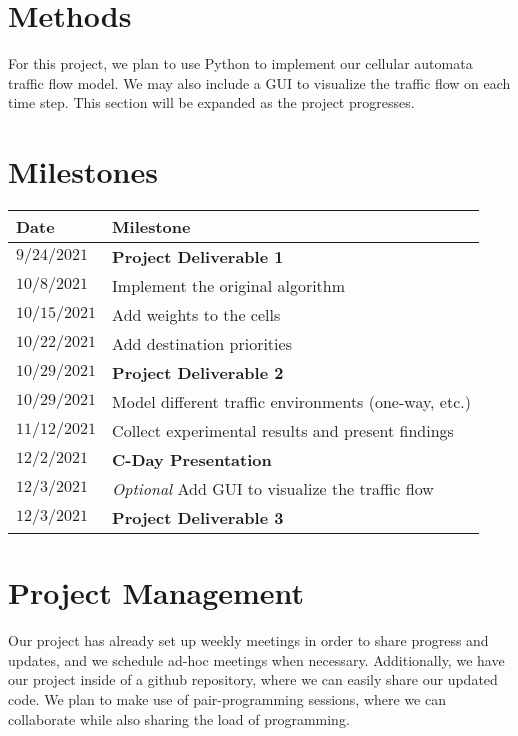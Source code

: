 \documentclass[sigplan,screen]{acmart}
\begin{document}
\section{Methods}
For this project, we plan to use Python to implement our cellular automata
traffic flow model. We may also include a GUI to visualize the traffic flow on
each time step. This section will be expanded as the project progresses.

\section{Milestones}
\begin{tabular}{|l|l|}
    \hline
    \textbf{Date} & \textbf{Milestone}                                      \\
    \hline
    $9/24/2021$   & \textbf{Project Deliverable 1}                          \\
    \hline
    $10/8/2021$   & Implement the original algorithm                        \\
    \hline
    $10/15/2021$  & Add weights to the cells                                \\
    \hline
    $10/22/2021$  & Add destination priorities                              \\

    \hline
    $10/29/2021$  & \textbf{Project Deliverable 2}                          \\
    \hline
    $10/29/2021$  & Model different traffic environments (one-way, etc.)    \\
    \hline
    $11/12/2021$  & Collect experimental results and present findings       \\
    \hline
    $12/2/2021$   & \textbf{C-Day Presentation}                             \\
    \hline
    $12/3/2021$   & \textit{Optional} Add GUI to visualize the traffic flow \\
    \hline
    $12/3/2021$   & \textbf{Project Deliverable 3}                          \\
    \hline
\end{tabular}

\section{Project Management}
Our project has already set up weekly meetings in order to share progress and
updates, and we schedule ad-hoc meetings when necessary. Additionally, we have
our project inside of a github repository, where we can easily share our updated
code. We plan to make use of pair-programming sessions, where we can collaborate
while also sharing the load of programming.
\end{document}

